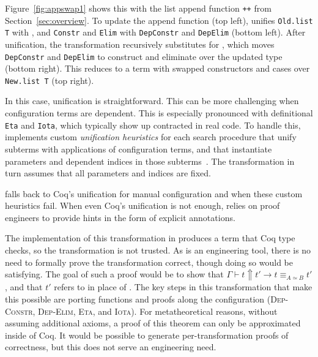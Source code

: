 Figure~\ref{fig:appswap1} shows this with the list append function \lstinline{++} from Section~\ref{sec:overview}.
To update the append function (top left), \toolname unifies \lstinline{Old.list T} with \A, and \lstinline{Constr} and \lstinline{Elim}
with \lstinline{DepConstr} and \lstinline{DepElim} (bottom left).
After unification, the transformation recursively substitutes \B
for \A, which moves \lstinline{DepConstr} and \lstinline{DepElim}
to construct and eliminate over the updated type (bottom right).
This reduces to a term with swapped constructors and cases over \lstinline{New.list T} (top right).

In this case, unification is straightforward. %
This can be more challenging when configuration terms are dependent.
This is especially pronounced with definitional \lstinline{Eta} and \lstinline{Iota},
which typically show up contracted in real code.
To handle this, \toolname implements custom \textit{unification heuristics} for each search procedure
that unify subterms with applications of configuration terms, and that instantiate parameters and dependent indices in those subterms~. %
The transformation in turn assumes that all parameters and indices are fixed.

\toolname falls back to Coq's unification for manual configuration and when these custom heuristics fail.
When even Coq's unification is not enough, \toolname relies on proof engineers to provide hints
in the form of explicit annotations.

The implementation of this transformation in \toolname produces a term that Coq type checks, so the transformation is not trusted.
As \toolname is an engineering tool, there is no need to formally prove the transformation correct, though doing so would be satisfying.
The goal of such a proof would be to show that %
$\Gamma \vdash t \Uparrow t' \rightarrow t \equiv_{A \simeq B} t'$, and that $t'$ refers to \B in place of \A.
The key steps in this transformation that make this possible are porting functions and proofs along the configuration %
(\textsc{Dep-Constr}, \textsc{Dep-Elim}, \textsc{Eta}, and \textsc{Iota}).
For metatheoretical reasons, without assuming additional axioms, a proof of this theorem can only be approximated inside of Coq.
It would be possible to generate per-transformation proofs of correctness, but this does not serve an engineering need.

